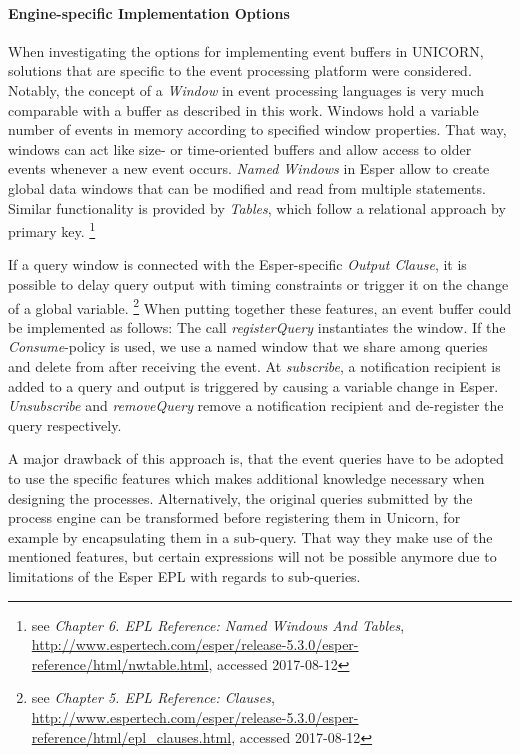 \paragraph{Engine-specific Implementation Options}
When investigating the options for implementing event buffers in UNICORN, solutions that are specific to the event processing platform were considered.
Notably, the concept of a \textit{Window} in event processing languages is very much comparable with a buffer as described in this work. Windows hold a variable number of events in memory according to specified window properties. That way, windows can act like size- or time-oriented buffers and allow access to older events whenever a new event occurs.
\textit{Named Windows} in Esper allow to create global data windows that can be modified and read from multiple statements. Similar functionality is provided by \textit{Tables}, which follow a relational approach by primary key.
\footnote{see \textit{Chapter 6. EPL Reference: Named Windows And Tables}, \url{http://www.espertech.com/esper/release-5.3.0/esper-reference/html/nwtable.html}, accessed 2017-08-12}

If a query window is connected with the Esper-specific \textit{Output Clause}, it is possible to delay query output with timing constraints or trigger it on the change of a global variable.
\footnote{see \textit{Chapter 5. EPL Reference: Clauses}, \url{http://www.espertech.com/esper/release-5.3.0/esper-reference/html/epl\_clauses.html}, accessed 2017-08-12}
When putting together these features, an event buffer could be implemented as follows: The call \textit{registerQuery} instantiates the window. If the \textit{Consume}-policy is used, we use a named window that we share among queries and delete from after receiving the event. 
At \textit{subscribe}, a notification recipient is added to a query and output is triggered by causing a variable change in Esper. \textit{Unsubscribe} and \textit{removeQuery} remove a notification recipient and de-register the query respectively.

A major drawback of this approach is, that the event queries have to be adopted to use the specific features which makes additional knowledge necessary when designing the processes.
Alternatively, the original queries submitted by the process engine can be transformed before registering them in Unicorn, for example by encapsulating them in a sub-query. That way they make use of the mentioned features, but certain expressions will not be possible anymore due to limitations of the Esper EPL with regards to sub-queries.

